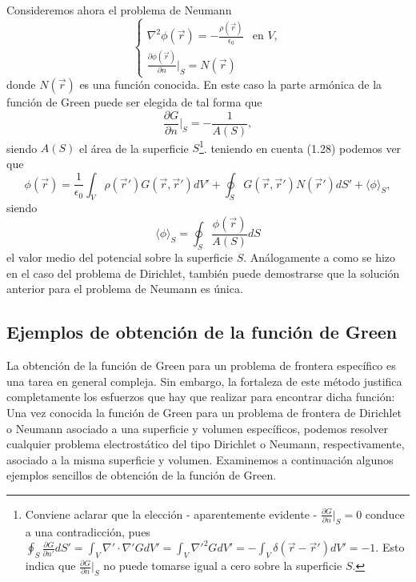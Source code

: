 \documentclass[12pt,a4paper]{book}
\begin{document}
Consideremos ahora el problema de Neumann
\begin{equation}
\begin{cases}
\nabla^2 \phi(\vec{r}) = -\frac{\rho(\vec{r})}{\epsilon_0} & \text{en } V, \\
\frac{\partial\phi(\vec{r})}{\partial n}\bigg|_S = N(\vec{r})
\end{cases}
\end{equation}
donde $N(\vec{r})$ es una función conocida. En este caso la parte armónica de la función de Green puede ser elegida de tal forma que
\begin{equation}
\frac{\partial G}{\partial n}\bigg|_S = -\frac{1}{A(S)},
\end{equation}
siendo $A(S)$ el área de la superficie $S$\footnote{Conviene aclarar que la elección - aparentemente evidente - $\frac{\partial G}{\partial n}\big|_S = 0$ conduce a una contradicción, pues $\oint_S \frac{\partial G}{\partial n'} dS' = \int_V \nabla' \cdot \nabla' G dV' = \int_V \nabla'^2 G dV' = -\int_V \delta(\vec{r} - \vec{r}')dV' = -1$. Esto indica que $\frac{\partial G}{\partial n}\big|_S$ no puede tomarse igual a cero sobre la superficie $S$.}. teniendo en cuenta (1.28) podemos ver que
\begin{equation}
\phi(\vec{r}) = \frac{1}{\epsilon_0} \int_V \rho(\vec{r}')G(\vec{r},\vec{r}') dV' + \oint_S G(\vec{r},\vec{r}')N(\vec{r}') dS' + \langle\phi\rangle_S,
\end{equation}
siendo
\begin{equation}
\langle\phi\rangle_S = \oint_S \frac{\phi(\vec{r})}{A(S)} dS
\end{equation}
el valor medio del potencial sobre la superficie $S$. Análogamente a como se hizo en el caso del problema de Dirichlet, también puede demostrarse que la solución anterior para el problema de Neumann es única.

\subsection{Ejemplos de obtención de la función de Green}

La obtención de la función de Green para un problema de frontera específico es una tarea en general compleja. Sin embargo, la fortaleza de este método justifica completamente los esfuerzos que hay que realizar para encontrar dicha función: Una vez conocida la función de Green para un problema de frontera de Dirichlet o Neumann asociado a una superficie y volumen específicos, podemos resolver cualquier problema electrostático del tipo Dirichlet o Neumann, respectivamente, asociado a la misma superficie y volumen. Examinemos a continuación algunos ejemplos sencillos de obtención de la función de Green.
\end{document}
